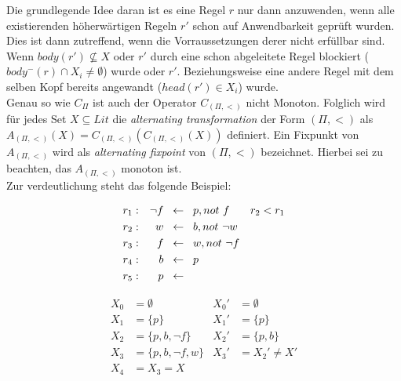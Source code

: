 Die grundlegende Idee daran ist es eine Regel $r$ nur dann anzuwenden, wenn alle
existierenden höherwärtigen Regeln $r'$ schon auf Anwendbarkeit geprüft wurden.
Dies ist dann zutreffend, wenn die Vorraussetzungen derer nicht erfüllbar sind.
Wenn $body(r') \not\subseteq X$ oder $r'$ durch eine schon abgeleitete Regel blockiert
($body^-(r) \cap X_i \neq \emptyset$) wurde oder $r'$.
Beziehungsweise eine andere Regel mit
dem selben Kopf bereits angewandt ($head(r') \in X_i$) wurde.\\
Genau so wie $C_\Pi$ ist auch der Operator $C_{(\Pi, <)}$ nicht Monoton.
Folglich wird für jedes Set $X \subseteq Lit$ die \emph{alternating transformation}
der Form $(\Pi, <)$ als $A_{(\Pi, <)}(X) = C_{(\Pi, <)}(C_{(\Pi, <)}(X))$ definiert.
Ein Fixpunkt von $A_{(\Pi, <)}$ wird als \emph{alternating fixpoint} von $(\Pi, <)$
bezeichnet. Hierbei sei zu beachten, das $A_{(\Pi, <)}$ monoton ist.\\



Zur verdeutlichung steht das folgende Beispiel:\\
  \begin{example}[$\Pi_{\ref{example:pi2}}, <$]
    \begin{align*}
      r_1: && \neg f \hspace*{0.2cm}&\leftarrow \hspace*{0.2cm}p, not~f &  r_2 < r_1\\
      r_2: && w \hspace*{0.2cm}&\leftarrow \hspace*{0.2cm}b, not~\neg w \\
      r_3: && f \hspace*{0.2cm}&\leftarrow \hspace*{0.2cm}w, not~\neg f \\
      r_4: && b \hspace*{0.2cm}&\leftarrow \hspace*{0.2cm}p \\
      r_5: && p \hspace*{0.2cm}&\leftarrow
    \end{align*}
    \label{example:pi2}
  \end{example}



\begin{align*}
  X_0 &= \emptyset           & X_0' &= \emptyset \\
  X_1 &= \{p\}               & X_1' &= \{p\} \\
  X_2 &= \{p, b, \neg f\}    & X_2' &= \{p, b\} \\
  X_3 &= \{p, b, \neg f, w\} & X_3' &= X_2' \not = X' \\
  X_4 &= X_3 = X
\end{align*}


